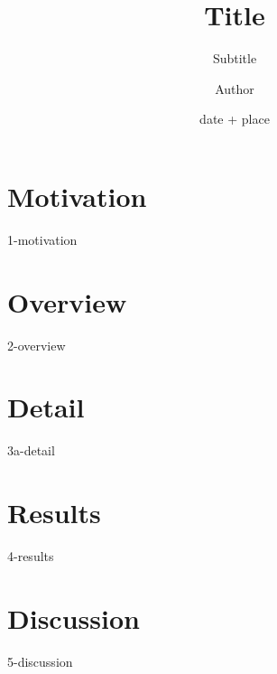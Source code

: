 \documentclass[aspectratio=169,12pt]{beamer}
\title{Title}
\subtitle{Subtitle}
\author{Author}
\date{date + place}
\begin{document}




\section*{Motivation}
{1-motivation}


\section{Overview}
{2-overview}


\section{Detail}
{3a-detail}


\section{Results}
{4-results}


\section{Discussion}
{5-discussion}
\end{document}
